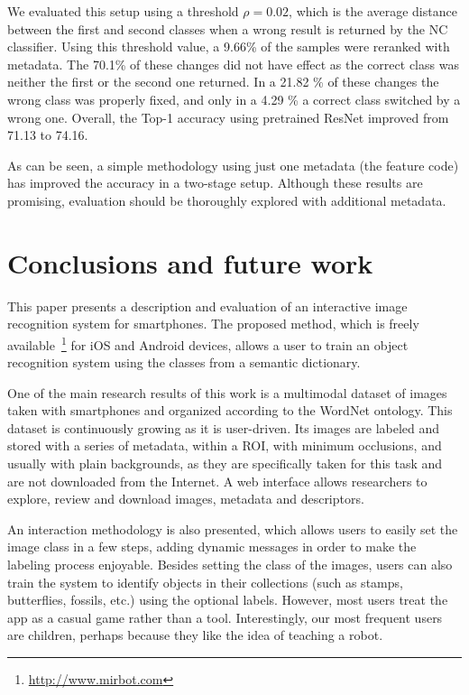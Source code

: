 \documentclass[final, twocolumn]{elsarticle}
\begin{document}
We evaluated this setup using a threshold $\rho = 0.02$, which is the average distance between the first and second classes when a wrong result is returned by the NC  classifier. Using this threshold value, a 9.66\% of the samples were reranked with metadata. The 70.1\% of these changes did not have effect as the correct class was neither the first or the second one returned. In a 21.82 \% of these changes the wrong class was properly fixed, and only in a 4.29 \% a correct class switched by a wrong one. Overall, the Top-1 accuracy using pretrained ResNet improved from 71.13 to 74.16. 

As can be seen, a simple methodology using just one metadata (the feature code) has  improved the accuracy in a two-stage setup. Although these results are promising, evaluation should be thoroughly explored with additional metadata.




\section{Conclusions and future work}
\label{conclusions}

This paper presents a description and evaluation of an interactive image recognition system for smartphones. The proposed method, which is freely available~\footnote{\url{http://www.mirbot.com}} for iOS and Android devices, allows a user to train an object recognition system using the classes from a semantic dictionary. 

One of the main research results of this work is a multimodal dataset of images taken with smartphones and organized according to the WordNet ontology. This dataset is continuously growing as it is user-driven. Its images are labeled and stored with a series of metadata, within a ROI, with minimum occlusions, and usually with plain backgrounds, as they are specifically taken for this task and are not downloaded from the Internet. A web interface allows researchers to explore, review and download images, metadata and descriptors. 

An interaction methodology is also presented, which allows users to easily set the image class in a few steps, adding dynamic messages in order to make the labeling process enjoyable. Besides setting the class of the images, users can also train the system to identify objects in their collections (such as stamps, butterflies, fossils, etc.) using the optional labels. However, most users treat the app as a casual game rather than a tool. Interestingly, our most frequent users are children, perhaps because they like the idea of teaching a robot.
\end{document}
